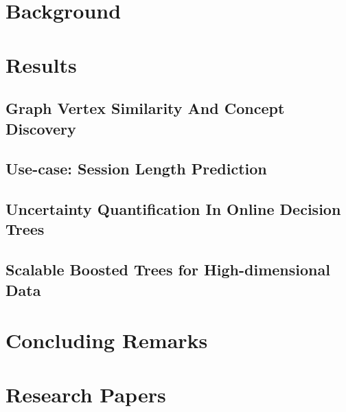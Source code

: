 \documentclass[g5paper,twoside,phd,electronic]{kthesis}
\begin{document}
\frontmatter
\maketitle
\makecopyright
\makededication



\tableofcontents*
\listoffigures
\listoftables
\listofalgorithms
\mainmatter

\newpage
\part{Background}
\label{part:bg}

\newpage

\newpage

\newpage

\newpage
%
\part{Results}
\label{part:results}
\chapter{Graph Vertex Similarity And Concept Discovery}
\label{ch:concepts}

\newpage
\chapter{Use-case: Session Length Prediction}
\label{ch:session-length}

\newpage
\chapter{Uncertainty Quantification In Online Decision Trees}
\label{ch:uncertain-trees}

\newpage
\chapter{Scalable Boosted Trees for High-dimensional Data}
\label{ch:boosted-trees}

\newpage
\part{Concluding Remarks}
\label{part:conclusion}




\part{Research Papers}

\afterpage{\null\thispagestyle{empty}}

\backmatter
\printindex
\end{document}

